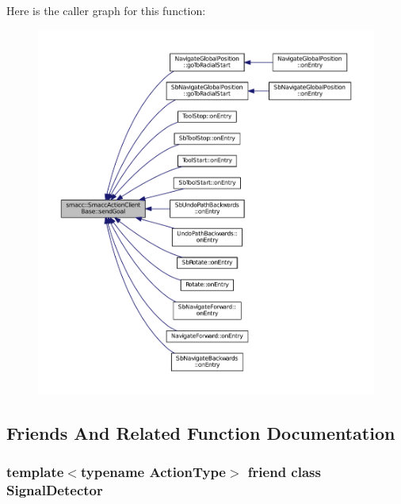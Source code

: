 Here is the caller graph for this function\+:
\nopagebreak
\begin{figure}[H]
\begin{center}
\leavevmode
\includegraphics[width=350pt]{classsmacc_1_1SmaccActionClientBase_a58c67a87c5fb8ea1633573c58fe3eee1_icgraph}
\end{center}
\end{figure}




\subsection{Friends And Related Function Documentation}
\subsubsection[{\texorpdfstring{Signal\+Detector}{SignalDetector}}]{\setlength{\rightskip}{0pt plus 5cm}template$<$typename Action\+Type$>$ friend class {\bf Signal\+Detector}\hspace{0.3cm}{\ttfamily [friend]}}\hypertarget{classsmacc_1_1SmaccActionClientBase_a9fb9044f83e768849d1b42d9d0d5508e}{}\label{classsmacc_1_1SmaccActionClientBase_a9fb9044f83e768849d1b42d9d0d5508e}


